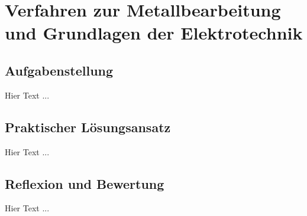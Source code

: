 \chapter{Verfahren zur Metallbearbeitung und Grundlagen der Elektrotechnik}
\label{cha:Metallbearbeitung und Elektrotechnik}

\section{Aufgabenstellung}

Hier Text ... 

\section{Praktischer Lösungsansatz}

Hier Text ... 

\section{Reflexion und Bewertung}

Hier Text ...
